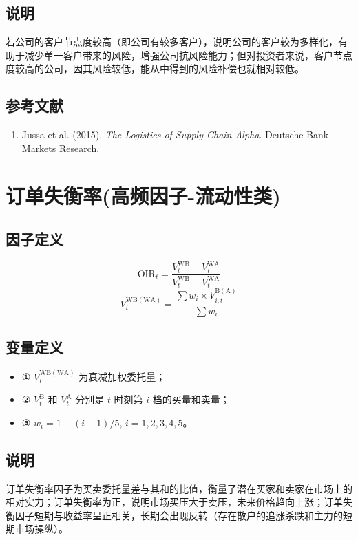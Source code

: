 \documentclass{article}
\begin{document}
\subsection{说明}
若公司的客户节点度较高（即公司有较多客户），说明公司的客户较为多样化，有助于减少单一客户带来的风险，增强公司抗风险能力；但对投资者来说，客户节点度较高的公司，因其风险较低，能从中得到的风险补偿也就相对较低。

\subsection{参考文献}
\begin{enumerate}
    \item Jussa et al. (2015). \textit{The Logistics of Supply Chain Alpha}. Deutsche Bank Markets Research.
\end{enumerate}

\section{订单失衡率(高频因子-流动性类)}

\subsection{因子定义}
\begin{equation}
    \mathrm{OIR}_t = \frac{V_t^{\mathrm{WB}} - V_t^{\mathrm{WA}}}{V_t^{\mathrm{WB}} + V_t^{\mathrm{WA}}}
\end{equation}
\begin{equation}
    V_t^{\mathrm{WB(WA)}} = \frac{\sum w_i \times V_{i,t}^{\mathrm{B(A)}}}{\sum w_i}
\end{equation}

\subsection{变量定义}
\begin{itemize}
    \item ① \( V_t^{\mathrm{WB(WA)}} \) 为衰减加权委托量；
    \item ② \( V_{t}^{\mathrm{B}} \) 和 \( V_{t}^{\mathrm{A}} \) 分别是 \( t \) 时刻第 \( i \) 档的买量和卖量；
    \item ③ \( w_i = 1 - (i-1)/5, \, i = 1, 2, 3, 4, 5 \)。
\end{itemize}

\subsection{说明}
订单失衡率因子为买卖委托量差与其和的比值，衡量了潜在买家和卖家在市场上的相对实力；订单失衡率为正，说明市场买压大于卖压，未来价格趋向上涨；订单失衡因子短期与收益率呈正相关，长期会出现反转（存在散户的追涨杀跌和主力的短期市场操纵）。
\end{document}
